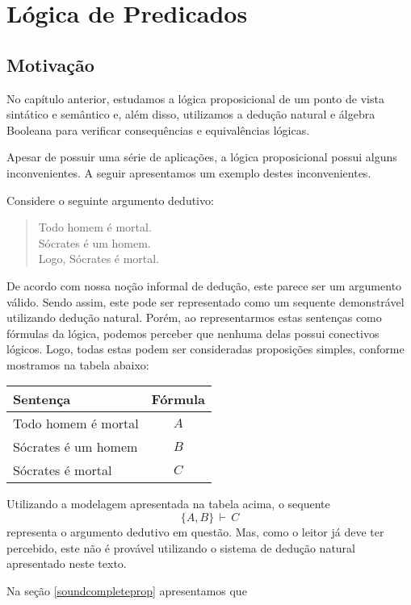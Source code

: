 \chapter{L\'ogica de Predicados}

\section{Motivação}

No capítulo anterior, estudamos a lógica proposicional de um ponto de
vista sintático e semântico e, além disso, utilizamos a dedução
natural e álgebra Booleana para verificar consequências e
equivalências lógicas.

Apesar de possuir uma série de aplicações, a lógica proposicional possui
alguns inconvenientes. A seguir apresentamos um exemplo destes
inconvenientes.
\begin{Example}
Considere o seguinte argumento dedutivo:
\begin{quote}
Todo homem é mortal.\\ Sócrates é um homem. \\Logo, Sócrates é mortal.
\end{quote}
De acordo com nossa noção informal de dedução, este parece ser um
argumento válido. Sendo assim, este pode ser representado como um
sequente demonstrável utilizando dedução natural. Porém, ao
representarmos estas sentenças como fórmulas da lógica, podemos
perceber que nenhuma delas possui conectivos lógicos. Logo, todas
estas podem ser consideradas proposições simples, conforme mostramos
na tabela abaixo:

\begin{table}[h]
  \begin{tabular}{|l|c|}
    \hline
    Sentença & Fórmula \\ \hline
    Todo homem é mortal & $A$ \\
    Sócrates é um homem & $B$ \\
    Sócrates é mortal & $C$ \\\hline
  \end{tabular}
  \centering
\end{table}

Utilizando a modelagem apresentada na tabela acima, o sequente
\[
\{A,B\}\,\vdash\,C
\]
representa o argumento dedutivo em questão. Mas, como o leitor já deve
ter percebido, este não é provável utilizando o sistema de dedução
natural apresentado neste texto.
\end{Example}

Na seção \ref{soundcompleteprop} apresentamos que
